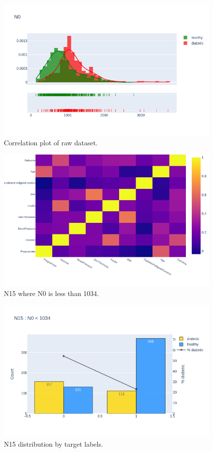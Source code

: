 \documentclass[12pt]{article}
\begin{document}
\begin{figure}[ht]
\centering
\includegraphics[width=1\textwidth]{newplot(39).png}
\caption{Correlation plot of raw dataset.}
\end{figure}

\begin{figure}[ht]
\centering
\includegraphics[width=1\textwidth]{newplot(3).png}
\caption{N15 where N0 is less than 1034.}
\end{figure}

\begin{figure}[ht]
\centering
\includegraphics[width=1\textwidth]{newplot(40).png}
\caption{N15 distribution by target labels.}
\end{figure}
\end{document}

